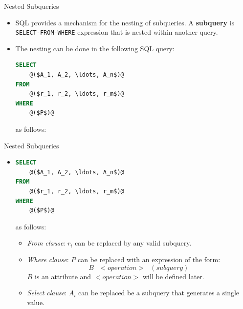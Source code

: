 \documentclass{beamer}
\begin{document}

\begin{frame}[fragile]{Nested Subqueries}
    \begin{itemize}
        \item SQL provides a mechanism for the nesting of subqueries.  A \textbf{subquery} is \texttt{SELECT-FROM-WHERE} expression that is nested within another query.
        \item The nesting can be done in the following SQL query:
        \begin{lstlisting}[language=SQL]
SELECT
    @($A_1, A_2, \ldots, A_n$)@
FROM
    @($r_1, r_2, \ldots, r_m$)@
WHERE
    @($P$)@
        \end{lstlisting}
        as follows:
    \end{itemize}
\end{frame}

\begin{frame}[fragile]{Nested Subqueries}
    \begin{itemize}
        \item[ ]
        \begin{lstlisting}[language=SQL]
SELECT
    @($A_1, A_2, \ldots, A_n$)@
FROM
    @($r_1, r_2, \ldots, r_m$)@
WHERE
    @($P$)@
        \end{lstlisting}
        as follows:
        \begin{itemize}
            \item \textit{From clause}: $r_i$ can be replaced by any valid subquery.
            \item \textit{Where clause}: $P$ can be replaced with an expression of the form:
            $$
                B \text{ } <operation> \text{ } (subquery)
            $$
            $B$ is an attribute and $<operation>$ will be defined later.
            \item \textit{Select clause}: $A_i$ can be replaced be a subquery that generates a single value.
        \end{itemize}
    \end{itemize}
\end{frame}
\end{document}
